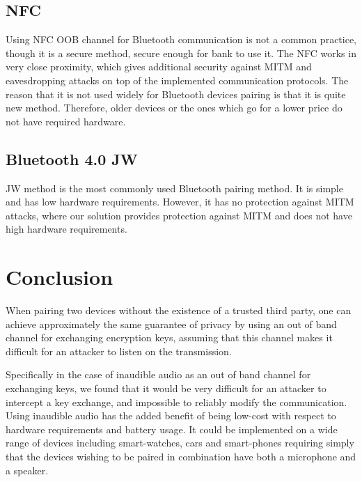 \documentclass[12pt]{article}
\begin{document}
\subsection{NFC}
\label{sub:Image scanning}

Using NFC OOB channel for Bluetooth communication is not a common practice, though it is a secure method, secure enough for bank to use it. The NFC works in very close proximity, which gives additional security against MITM and eavesdropping attacks on top of the implemented communication protocols. The reason that it is not used widely for Bluetooth devices pairing is that it is quite new method. Therefore, older devices or the ones which go for a lower price do not have required hardware.

\subsection{Bluetooth 4.0 JW}
\label{sub:Bluetooth 4.0 JW}

JW method is the most commonly used Bluetooth pairing method. It is simple and has low hardware requirements. However, it has no protection against MITM attacks, where our solution provides protection against MITM and does not have high hardware requirements.

\newpage

\section{Conclusion}
\label{sec:Conclusion}

When pairing two devices without the existence of a trusted third party, one can achieve approximately the same guarantee of privacy by using an out of band channel for exchanging encryption keys, assuming that this channel makes it difficult for an attacker to listen on the transmission.

Specifically in the case of inaudible audio as an out of band channel for exchanging keys, we found that it would be very difficult for an attacker to intercept a key exchange, and impossible to reliably modify the communication. Using inaudible audio has the added benefit of being low-cost with respect to hardware requirements and battery usage. It could be implemented on a wide range of devices including smart-watches, cars and smart-phones requiring simply that the devices wishing to be paired in combination have both a microphone and a speaker.

\newpage


\nocite{*}

\end{document}
